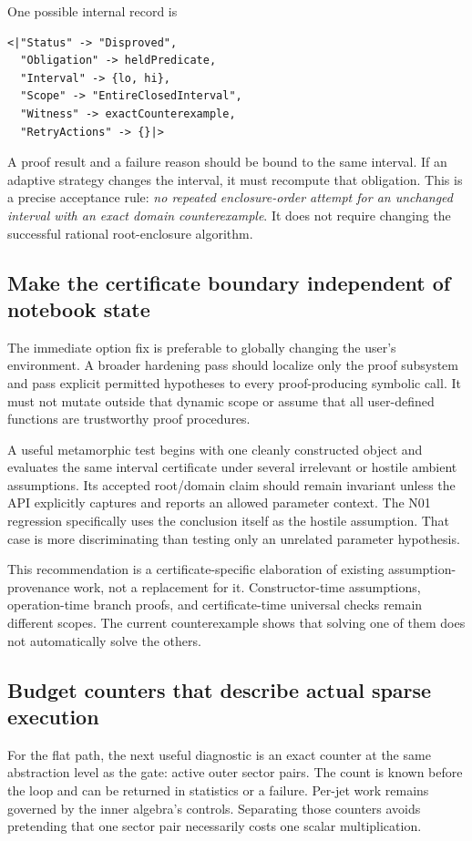 \documentclass[11pt,a4paper]{article}
\newcommand{\code}[1]{\texttt{\detokenize{#1}}}
\begin{document}
One possible internal record is
\begin{lstlisting}
<|"Status" -> "Disproved",
  "Obligation" -> heldPredicate,
  "Interval" -> {lo, hi},
  "Scope" -> "EntireClosedInterval",
  "Witness" -> exactCounterexample,
  "RetryActions" -> {}|>
\end{lstlisting}
A proof result and a failure reason should be bound to the same interval. If an adaptive strategy changes the interval, it must recompute that obligation. This is a precise acceptance rule: \emph{no repeated enclosure-order attempt for an unchanged interval with an exact domain counterexample}. It does not require changing the successful rational root-enclosure algorithm.

\subsection{Make the certificate boundary independent of notebook state}
The immediate \code{Refine} option fix is preferable to globally changing the user's environment. A broader hardening pass should localize only the proof subsystem and pass explicit permitted hypotheses to every proof-producing symbolic call. It must not mutate \code{$Assumptions} outside that dynamic scope or assume that all user-defined functions are trustworthy proof procedures.

A useful metamorphic test begins with one cleanly constructed object and evaluates the same interval certificate under several irrelevant or hostile ambient assumptions. Its accepted root/domain claim should remain invariant unless the API explicitly captures and reports an allowed parameter context. The N01 regression specifically uses the conclusion itself as the hostile assumption. That case is more discriminating than testing only an unrelated parameter hypothesis.

This recommendation is a certificate-specific elaboration of existing assumption-provenance work, not a replacement for it. Constructor-time assumptions, operation-time branch proofs, and certificate-time universal checks remain different scopes. The current counterexample shows that solving one of them does not automatically solve the others.

\subsection{Budget counters that describe actual sparse execution}
For the flat path, the next useful diagnostic is an exact counter at the same abstraction level as the gate: active outer sector pairs. The count is known before the loop and can be returned in statistics or a failure. Per-jet work remains governed by the inner algebra's controls. Separating those counters avoids pretending that one sector pair necessarily costs one scalar multiplication.
\end{document}

